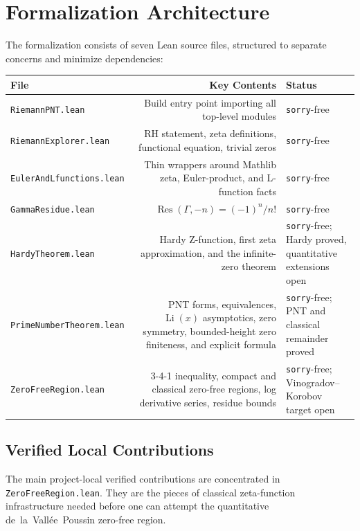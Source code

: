 \documentclass[11pt,a4paper]{article}
\theoremstyle{remark}
\begin{document}
\section{Formalization Architecture}

The formalization consists of seven Lean source files, structured to separate
concerns and minimize dependencies:

\begin{center}
\begin{tabular}{lrl}
\toprule
\textbf{File} & \textbf{Key Contents} & \textbf{Status} \\
\midrule
\texttt{RiemannPNT.lean} &
  Build entry point importing all top-level modules &
  \texttt{sorry}-free \\
\texttt{RiemannExplorer.lean} &
  RH statement, zeta definitions, functional equation, trivial zeros &
  \texttt{sorry}-free \\
\texttt{EulerAndLfunctions.lean} &
  Thin wrappers around Mathlib zeta, Euler-product, and L-function facts &
  \texttt{sorry}-free \\
\texttt{GammaResidue.lean} &
  $\operatorname{Res}(\Gamma,-n)=(-1)^{n}/n!$ &
  \texttt{sorry}-free \\
\texttt{HardyTheorem.lean} &
  Hardy Z-function, first zeta approximation, and the infinite-zero theorem &
  \texttt{sorry}-free; Hardy proved, quantitative extensions open \\
\texttt{PrimeNumberTheorem.lean} &
  PNT forms, equivalences, $\operatorname{Li}(x)$ asymptotics, zero symmetry,
  bounded-height zero finiteness, and explicit formula &
  \texttt{sorry}-free; PNT and classical remainder proved \\
\texttt{ZeroFreeRegion.lean} &
  3-4-1 inequality, compact and classical zero-free regions, log derivative
  series, residue bounds &
  \texttt{sorry}-free; Vinogradov--Korobov target open \\
\bottomrule
\end{tabular}
\end{center}

\subsection{Verified Local Contributions}

The main project-local verified contributions are concentrated in
\texttt{ZeroFreeRegion.lean}.  They are the pieces of classical zeta-function
infrastructure needed before one can attempt the quantitative
de~la~Vall\'ee~Poussin zero-free region.
\end{document}

